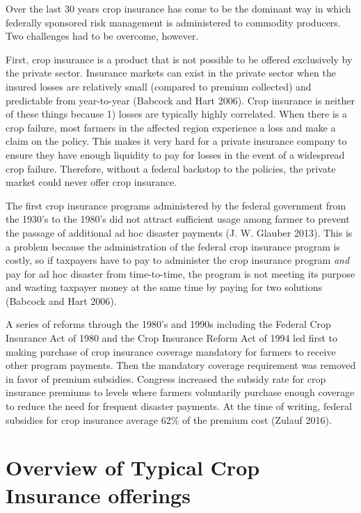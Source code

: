 \documentclass[
  letterpaper,
  DIV=11,
  numbers=noendperiod]{scrreprt}
\begin{document}
Over the last 30 years crop insurance has come to be the dominant way in
which federally sponsored risk management is administered to commodity
producers. Two challenges had to be overcome, however.

First, crop insurance is a product that is not possible to be offered
exclusively by the private sector. Insurance markets can exist in the
private sector when the insured losses are relatively small (compared to
premium collected) and predictable from year-to-year (Babcock and Hart
2006). Crop insurance is neither of these things because 1) losses are
typically highly correlated. When there is a crop failure, most farmers
in the affected region experience a loss and make a claim on the policy.
This makes it very hard for a private insurance company to ensure they
have enough liquidity to pay for losses in the event of a widespread
crop failure. Therefore, without a federal backstop to the policies, the
private market could never offer crop insurance.

The first crop insurance programs administered by the federal government
from the 1930's to the 1980's did not attract sufficient usage among
farmer to prevent the passage of additional ad hoc disaster payments (J.
W. Glauber 2013). This is a problem because the administration of the
federal crop insurance program is costly, so if taxpayers have to pay to
administer the crop insurance program \emph{and} pay for ad hoc disaster
from time-to-time, the program is not meeting its purpose and wasting
taxpayer money at the same time by paying for two solutions (Babcock and
Hart 2006).

A series of reforms through the 1980's and 1990s including the Federal
Crop Insurance Act of 1980 and the Crop Insurance Reform Act of 1994 led
first to making purchase of crop insurance coverage mandatory for
farmers to receive other program payments. Then the mandatory coverage
requirement was removed in favor of premium subsidies. Congress
increased the subsidy rate for crop insurance premiums to levels where
farmers voluntarily purchase enough coverage to reduce the need for
frequent disaster payments. At the time of writing, federal subsidies
for crop insurance average 62\% of the premium cost (Zulauf 2016).

\section{Overview of Typical Crop Insurance
offerings}\label{overview-of-typical-crop-insurance-offerings}
\end{document}
